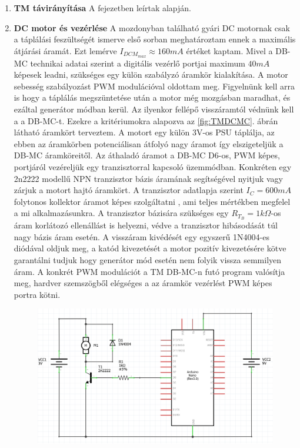 \documentclass[a4paper,12pt]{article}
\begin{document}
\begin{enumerate}
	\item \textbf{TM távirányítása}
	A \textit{} fejezetben leírtak alapján.
	\item \textbf{DC motor és vezérlése}
	A mozdonyban található gyári DC motornak csak a táplálási feszültségét ismerve első sorban meghatároztam ennek a maximális átjárási áramát.
	Ezt lemérve $I_{DCM_{max}} \approx 160 mA$ értéket kaptam. 
	Mivel a DB-MC technikai adatai szerint a digitális vezérlő portjai maximum  $40 mA$ képesek leadni, szükséges egy  külön szabályzó áramkör kialakítása.
	A motor sebesség szabályozást PWM modulációval oldottam meg. Figyelnünk kell arra is hogy a táplálás megszüntetése után a motor még mozgásban maradhat, és ezáltal generátor módban kerül. 
	Az ilyenkor fellépő visszáramtól védnünk kell a a DB-MC-t.
	Ezekre a kritériumokra alapozva az \ref{fig:TMDCMC}. ábrán látható áramkört terveztem. 
	A motort egy külön 3V-os PSU táplálja, az ebben az áramkörben potenciálisan átfolyó nagy áramot így elszigeteljük a DB-MC áramköreitől.
	Az áthaladó áramot a DB-MC D6-os, PWM képes, portjáról vezéreljük egy tranzisztorral kapcsoló üzemmódban.
	Konkréten egy 2n2222 modellű NPN tranzisztor bázis áramának segítségével nyitjuk vagy zárjuk a motort hajtó áramkört.
	A tranzisztor adatlapja szerint $I_{C} = 600 mA$ folytonos kollektor áramot képes szolgáltatni \cite{os2n19}, ami teljes mértékben megfelel a mi alkalmazásunkra.
	A tranzisztor bázisára szükséges egy $R_{T_{B}} = 1k\Omega$-os áram korlátozó ellenállást is helyezni, védve a tranzisztor hibásodását túl nagy bázis áram esetén.
	A visszáram kivédését egy egyszerű 1N4004-es diódával oldjuk meg, a katód kivezetését a motor pozitív kivezetésére kötve garantálni tudjuk hogy generátor mód esetén nem folyik vissza semmilyen áram.
	A konkrét PWM modulációt a TM DB-MC-n futó program valósítja meg, hardver szemszögből elégséges a az áramkör vezérlést PWM képes portra kötni.
    \begin{figure}[htp]
        \centering
        \begin{minipage}{0.5\textwidth}
            \centering
		    \includegraphics[width=\linewidth]{images/TMDCMC.png}

\end{minipage}
\end{figure}
\end{enumerate}
\end{document}
